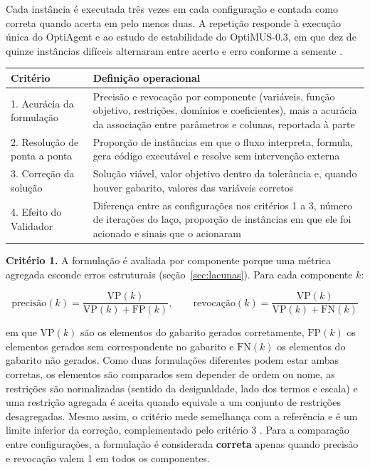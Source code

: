 Cada instância é executada três vezes em cada configuração e contada como correta quando acerta em pelo menos duas. A repetição responde à execução única do OptiAgent \cite[p.~11]{monteiro2026} e ao estudo de estabilidade do OptiMUS-0.3, em que dez de quinze instâncias difíceis alternaram entre acerto e erro conforme a semente \cite{ahmaditeshnizi2026}.

\begin{quadro}[htbp]
\caption{Critérios de avaliação do experimento computacional}
\label{q:criterios}
\centering
\small
\begin{tabularx}{\textwidth}{@{}l X@{}}
\toprule
Critério & Definição operacional \\
\midrule
1. Acurácia da formulação & Precisão e revocação por componente (variáveis, função objetivo, restrições, domínios e coeficientes), mais a acurácia da associação entre parâmetros e colunas, reportada à parte \\
2. Resolução de ponta a ponta & Proporção de instâncias em que o fluxo interpreta, formula, gera código executável e resolve sem intervenção externa \\
3. Correção da solução & Solução viável, valor objetivo dentro da tolerância e, quando houver gabarito, valores das variáveis corretos \\
4. Efeito do Validador & Diferença entre as configurações nos critérios 1 a 3, número de iterações do laço, proporção de instâncias em que ele foi acionado e sinais que o acionaram \\
\bottomrule
\end{tabularx}
\end{quadro}

\textbf{Critério 1.} A formulação é avaliada por componente porque uma métrica agregada esconde erros estruturais (seção~\ref{sec:lacunas}). Para cada componente $k$:

\begin{equation*}
  \text{precisão}(k) = \frac{\mathrm{VP}(k)}{\mathrm{VP}(k) + \mathrm{FP}(k)}, \qquad
  \text{revocação}(k) = \frac{\mathrm{VP}(k)}{\mathrm{VP}(k) + \mathrm{FN}(k)}
\end{equation*}

em que $\mathrm{VP}(k)$ são os elementos do gabarito gerados corretamente, $\mathrm{FP}(k)$ os elementos gerados sem correspondente no gabarito e $\mathrm{FN}(k)$ os elementos do gabarito não gerados. Como duas formulações diferentes podem estar ambas corretas, os elementos são comparados sem depender de ordem ou nome, as restrições são normalizadas (sentido da desigualdade, lado dos termos e escala) e uma restrição agregada é aceita quando equivale a um conjunto de restrições desagregadas. Mesmo assim, o critério mede semelhança com a referência e é um limite inferior da correção, complementado pelo critério 3 \cite{ahmaditeshnizi2026}. Para a comparação entre configurações, a formulação é considerada \textbf{correta} apenas quando precisão e revocação valem 1 em todos os componentes.

